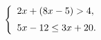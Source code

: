 \begin{ex}[type=ineq_system]
	\begin{condition}
		\( \left\{
		\begin{array}{l}
			2x+(8x-5)>4,\vspace{2mm}\\
			5x-12\le3x+20.
		\end{array}
		\right. \)
	\end{condition}
	\answer{\( (0,9;16] \)}
\end{ex}